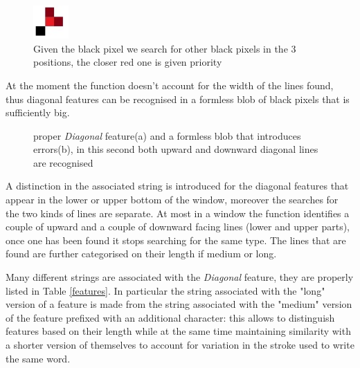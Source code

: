 \begin{figure}[!htpb]
\centering
\includegraphics[width=0.12\textwidth]{images/diagP.jpg}
\caption{Given the black pixel we search for other black pixels in the 3 positions, the closer red one is given priority}
\label{pixels}
\end{figure} 
\vspace{3mm}
At the moment the function doesn't account for the width of the lines found, thus diagonal features can be recognised in a formless blob of black pixels that is sufficiently big. 

\begin{figure}[!htpb]
 \centering
 \hspace{15mm}
 \caption{proper \textit{Diagonal} feature(a) and a formless blob that introduces errors(b), in this second both upward and downward diagonal lines are recognised}
  \end{figure}
\vspace{2mm}
   
A distinction in the associated string is introduced for the diagonal features that appear in the lower or upper bottom of the window, moreover the searches for the two kinds of lines are separate.
At most in a window the function identifies a couple of upward and a couple of downward facing lines (lower and upper parts), once one has been found it stops searching for the same type.
The lines that are found are further categorised on their length if medium or long.

Many different strings are associated with the \textit{Diagonal} feature, they are properly listed in Table \ref{features}.
In particular the string associated with the "long" version of a feature is made from the string associated with the "medium" version of the feature prefixed with an additional character: this allows to distinguish features based on their length while at the same time maintaining similarity with a shorter version of themselves to account for variation in the stroke used to write the same word.  
 

